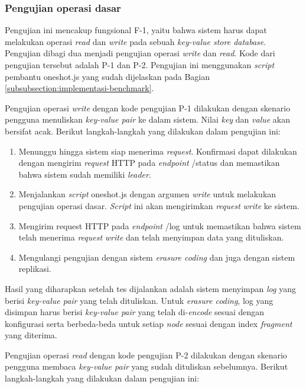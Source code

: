 \subsubsection{Pengujian operasi dasar}
\label{subsubsection:pengujian-operasi-dasar}

Pengujian ini mencakup fungsional F-1, yaitu bahwa sistem harus dapat melakukan operasi \textit{read} dan \textit{write} pada sebuah \textit{key-value store database}. Pengujian dibagi dua menjadi pengujian operasi \textit{write} dan \textit{read}. Kode dari pengujian tersebut adalah P-1 dan P-2. Pengujian ini menggunakan \textit{script} pembantu oneshot.js yang sudah dijelaskan pada Bagian \ref{subsubsection:implementasi-benchmark}.

Pengujian operasi \textit{write} dengan kode pengujian P-1 dilakukan dengan skenario pengguna menuliskan \textit{key-value pair} ke dalam sistem. Nilai \textit{key} dan \textit{value} akan bersifat acak. Berikut langkah-langkah yang dilakukan dalam pengujian ini:

\begin{enumerate}
	\item Menunggu hingga sistem siap menerima \textit{request}. Konfirmasi dapat dilakukan dengan mengirim \textit{request} HTTP pada \textit{endpoint} /status dan memastikan bahwa sistem sudah memiliki \textit{leader}.
	\item Menjalankan \textit{script} oneshot.js dengan argumen \textit{write} untuk melakukan pengujian operasi dasar. \textit{Script} ini akan mengirimkan \textit{request} \textit{write} ke sistem.
	\item Mengirim request HTTP pada \textit{endpoint} /log untuk memastikan bahwa sistem telah menerima \textit{request} \textit{write} dan telah menyimpan data yang dituliskan.
	\item Mengulangi pengujian dengan sistem \textit{erasure coding} dan juga dengan sistem replikasi.
\end{enumerate}

Hasil yang diharapkan setelah tes dijalankan adalah sistem menyimpan \textit{log} yang berisi \textit{key-value pair} yang telah dituliskan. Untuk \textit{erasure coding}, log yang disimpan harus berisi \textit{key-value pair} yang telah di-\textit{encode} sesuai dengan konfigurasi serta berbeda-beda untuk setiap \textit{node} sesuai dengan index \textit{fragment} yang diterima.

Pengujian operasi \textit{read} dengan kode pengujian P-2 dilakukan dengan skenario pengguna membaca \textit{key-value pair} yang sudah dituliskan sebelumnya. Berikut langkah-langkah yang dilakukan dalam pengujian ini:

